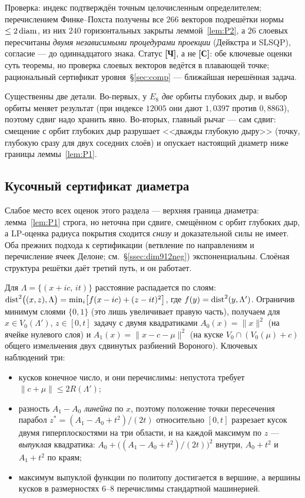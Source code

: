Проверка: индекс подтверждён точным целочисленным определителем; перечислением
Финке--Похста получены все $266$ векторов подрешётки нормы $\le2\operatorname{diam}$, из них
$240$ горизонтальных закрыты леммой~\ref{lem:P2}, а $26$ слоевых пересчитаны
\emph{двумя независимыми процедурами проекции} (Дейкстра и SLSQP), согласие ---
до одиннадцатого знака. Статус \textbf{[Ч]}, а не \textbf{[С]}: обе ключевые
оценки суть теоремы, но проверка слоевых векторов ведётся в плавающей точке;
рациональный сертификат уровня~\S\ref{sec:comp} --- ближайшая нерешённая задача.

Существенны две детали. Во-первых, у $E_8$ \emph{две} орбиты глубоких дыр, и
выбор орбиты меняет результат (при индексе $12005$ они дают $1{,}0397$ против
$0{,}8863$), поэтому сдвиг надо хранить явно. Во-вторых, главный рычаг --- сам
сдвиг: смещение с орбит глубоких дыр разрушает <<дважды глубокую дыру>> (точку,
глубокую сразу для двух соседних слоёв) и опускает настоящий диаметр ниже
границы леммы~\ref{lem:P1}.

\subsection{Кусочный сертификат диаметра}\label{ssec:cert}

Слабое место всех оценок этого раздела --- верхняя граница диаметра:
лемма~\ref{lem:P1} строга, но неточна при сдвиге, смещённом с орбит глубоких дыр, а
LP-оценка радиуса покрытия сходится \emph{снизу} и доказательной силы не имеет.
Оба прежних подхода к сертификации (ветвление по направлениям и перечисление
ячеек Делоне; см.~\S\ref{ssec:dim912neg}) экспоненциальны. Слоёная структура
решётки даёт третий путь, и он работает.

Для $\Lambda=\{(x+ic,\,it)\}$ расстояние распадается по слоям:
$\operatorname{dist}^2\bigl((x,z),\Lambda\bigr)=\min_i\bigl[f(x-ic)+(z-it)^2\bigr]$, где
$f(y)=\operatorname{dist}^2(y,\Lambda')$. Ограничив минимум слоями $\{0,1\}$ (это лишь
увеличивает правую часть), получаем для $x\in V_0(\Lambda')$, $z\in[0,t]$
задачу с двумя квадратиками $A_0(x)=\|x\|^2$ (на ячейке нулевого слоя) и
$A_1(x)=\|x-c-\mu\|^2$ (на куске $V_0\cap(V_0(\mu)+c)$ общего измельчения двух
сдвинутых разбиений Вороного). Ключевых наблюдений три:

\begin{itemize}[leftmargin=1.4em,itemsep=1pt]
\item кусков конечное число, и они перечислимы: непустота требует
$\|c+\mu\|\le2R(\Lambda')$;
\item разность $A_1-A_0$ \emph{линейна} по $x$, поэтому положение точки
пересечения парабол $z^*=(A_1-A_0+t^2)/(2t)$ относительно $[0,t]$ разрезает
кусок двумя гиперплоскостями на три области, и на каждой максимум по $z$ ---
\emph{выпуклая} квадратика: $A_0+\bigl((A_1-A_0+t^2)/(2t)\bigr)^2$ внутри,
$A_0+t^2$ и $A_1+t^2$ по краям;
\item максимум выпуклой функции по политопу достигается в вершине, а вершины
кусков в размерностях $6$--$8$ перечислимы стандартной машинерией.
\end{itemize}

